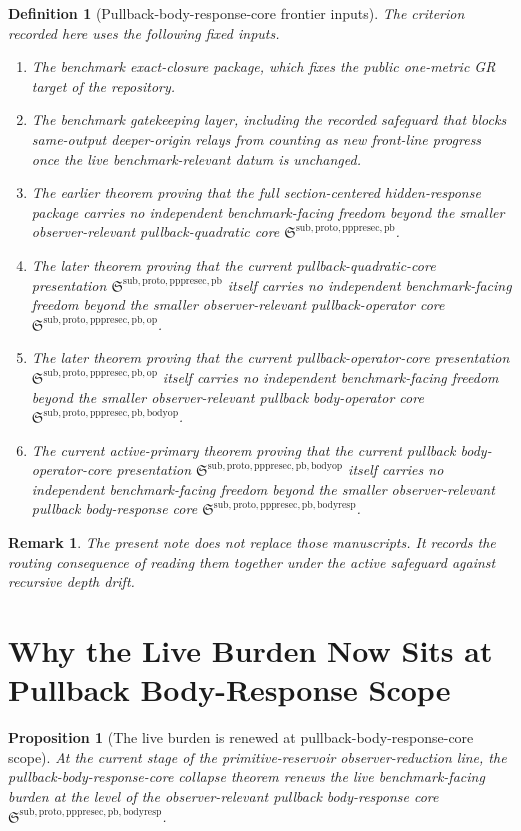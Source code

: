 \documentclass[11pt]{article}
\newcommand{\PrePreProtoSectionPullbackCore}{\mathfrak S^{\mathrm{sub,proto,pppresec,pb}}}
\newcommand{\PullbackOperatorCore}{\mathfrak S^{\mathrm{sub,proto,pppresec,pb,op}}}
\newcommand{\PullbackBodyOperatorCore}{\mathfrak S^{\mathrm{sub,proto,pppresec,pb,bodyop}}}
\newcommand{\PullbackBodyResponseCore}{\mathfrak S^{\mathrm{sub,proto,pppresec,pb,bodyresp}}}
\newtheorem{definition}{Definition}
\newtheorem{proposition}{Proposition}
\newtheorem{remark}{Remark}
\begin{document}
\begin{definition}[Pullback-body-response-core frontier inputs]
The criterion recorded here uses the following fixed inputs.
\begin{enumerate}
    \item The benchmark exact-closure package, which fixes the public one-metric GR target of the repository.
    \item The benchmark gatekeeping layer, including the recorded safeguard that blocks same-output deeper-origin relays from counting as new front-line progress once the live benchmark-relevant datum is unchanged.
    \item The earlier theorem proving that the full section-centered hidden-response package carries no independent benchmark-facing freedom beyond the smaller observer-relevant pullback-quadratic core \(\PrePreProtoSectionPullbackCore\).
    \item The later theorem proving that the current pullback-quadratic-core presentation \(\PrePreProtoSectionPullbackCore\) itself carries no independent benchmark-facing freedom beyond the smaller observer-relevant pullback-operator core \(\PullbackOperatorCore\).
    \item The later theorem proving that the current pullback-operator-core presentation \(\PullbackOperatorCore\) itself carries no independent benchmark-facing freedom beyond the smaller observer-relevant pullback body-operator core \(\PullbackBodyOperatorCore\).
    \item The current active-primary theorem proving that the current pullback body-operator-core presentation \(\PullbackBodyOperatorCore\) itself carries no independent benchmark-facing freedom beyond the smaller observer-relevant pullback body-response core \(\PullbackBodyResponseCore\).
\end{enumerate}
\end{definition}

\begin{remark}
The present note does not replace those manuscripts. It records the routing consequence of reading them together under the active safeguard against recursive depth drift.
\end{remark}

\section{Why the Live Burden Now Sits at Pullback Body-Response Scope}

\begin{proposition}[The live burden is renewed at pullback-body-response-core scope]
At the current stage of the primitive-reservoir observer-reduction line, the pullback-body-response-core collapse theorem renews the live benchmark-facing burden at the level of the observer-relevant pullback body-response core \(\PullbackBodyResponseCore\).
\end{proposition}
\end{document}
